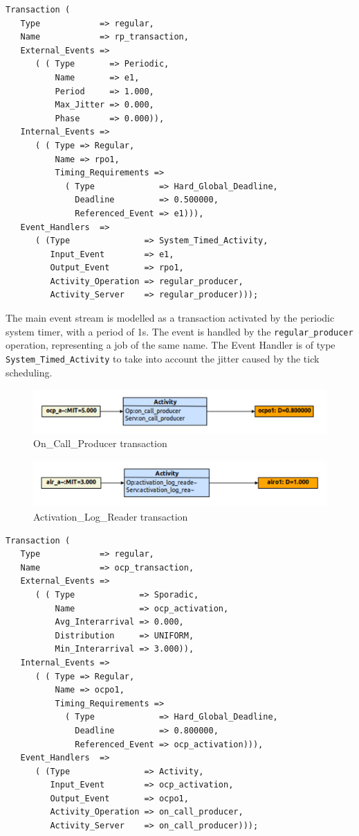 \documentclass{article}
\begin{document}
\begin{lstlisting}
Transaction (
   Type            => regular,
   Name            => rp_transaction,
   External_Events =>
      ( ( Type       => Periodic,
          Name       => e1,
          Period     => 1.000,
          Max_Jitter => 0.000,
          Phase      => 0.000)),
   Internal_Events =>
      ( ( Type => Regular,
          Name => rpo1,
          Timing_Requirements =>
            ( Type             => Hard_Global_Deadline,
              Deadline         => 0.500000,
              Referenced_Event => e1))),
   Event_Handlers  =>
      ( (Type               => System_Timed_Activity,
         Input_Event        => e1,
         Output_Event       => rpo1,
         Activity_Operation => regular_producer,
         Activity_Server    => regular_producer)));
\end{lstlisting}

The main event stream is modelled as a transaction activated by the periodic system timer, with a period of 1s. The event is handled by the \texttt{regular\_producer} operation, representing a job of the same name. The Event Handler is of type \texttt{System\_Timed\_Activity} to take into account the jitter caused by the tick scheduling.

\begin{figure}[!htbp]
\centering
\includegraphics[width=5in]{images/transaction-ocp}
\caption{On\_Call\_Producer transaction}
\label{transaction-ocp}
\end{figure}

\begin{figure}[!htbp]
\centering
\includegraphics[width=5in]{images/transaction-alr}
\caption{Activation\_Log\_Reader transaction}
\label{transaction-alr}
\end{figure}

\begin{lstlisting}
Transaction (
   Type            => regular,
   Name            => ocp_transaction,
   External_Events =>
      ( ( Type             => Sporadic,
          Name             => ocp_activation,
          Avg_Interarrival => 0.000,
          Distribution     => UNIFORM,
          Min_Interarrival => 3.000)),
   Internal_Events =>
      ( ( Type => Regular,
          Name => ocpo1,
          Timing_Requirements =>
            ( Type             => Hard_Global_Deadline,
              Deadline         => 0.800000,
              Referenced_Event => ocp_activation))),
   Event_Handlers  =>
      ( (Type               => Activity,
         Input_Event        => ocp_activation,
         Output_Event       => ocpo1,
         Activity_Operation => on_call_producer,
         Activity_Server    => on_call_producer)));
\end{lstlisting}
\end{document}
